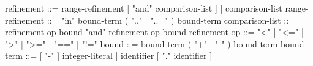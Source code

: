 \begin{grammar}
refinement       ::= range-refinement [ "and" comparison-list ]
                   | comparison-list
range-refinement ::= "in" bound-term ( ".." | "..=" ) bound-term
comparison-list  ::= refinement-op bound { "and" refinement-op bound }
refinement-op    ::= "<" | "<=" | ">" | ">=" | "==" | "!="
bound            ::= bound-term { ( "+" | "-" ) bound-term }
bound-term       ::= [ "-" ] integer-literal | identifier [ "." identifier ]

\end{grammar}



